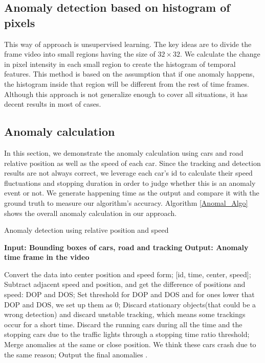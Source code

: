 \documentclass[10pt,twocolumn,letterpaper]{article}
\begin{document}
\subsection{Anomaly detection based on histogram of pixels}
This way of approach is unsupervised learning. The key ideas are to divide the frame video into small regions having the size of $32 \times 32$. We calculate the change in pixel intensity in each small region to create the histogram of temporal features. This method is based on the assumption that if one anomaly happens, the histogram inside that region will be different from the rest of time frames. Although this approach is not generalize enough to cover all situations, it has decent results in most of cases.

\subsection{Anomaly calculation}
In this section, we demonstrate the anomaly calculation using cars and road relative position as well as the speed of each car. Since the tracking and detection results are not always correct, we leverage each car’s id to calculate their speed fluctuations and stopping duration in order to judge whether this is an anomaly event or not. We generate happening time as the output and compare it with the ground truth to measure our algorithm’s accuracy. Algorithm \ref{Anomal_Algo} shows the overall anomaly calculation in our approach.

\begin{algorithm}[!tbp]
\caption{Anomaly detection using relative position and speed}\label{Anomal_Algo}

\begin{algorithmic}[0]
\State \textbf{Input: Bounding boxes of cars, road and tracking} 
\State \textbf{Output: Anomaly time frame in the video} 
\end{algorithmic}

\begin{algorithmic}[1]

\State Convert the data into center position and speed form; [id, time, center, speed];
\State Subtract adjacent speed and position, and get the difference of positions and speed: DOP and DOS;
\State Set threshold for DOP and DOS and for ones lower that DOP and DOS, we set up them as 0;
\State Discard stationary objects(that could be a wrong detection) and discard unstable tracking, which means some trackings occur for a short time.
\State Discard the running cars during all the time and the stopping cars due to the traffic lights through a stopping time ratio threshold;
\State Merge anomalies at the same or close position. We think these cars crash due to the same reason;
\State Output the final anomalies .

\end{algorithmic}
\end{algorithm}
\end{document}
